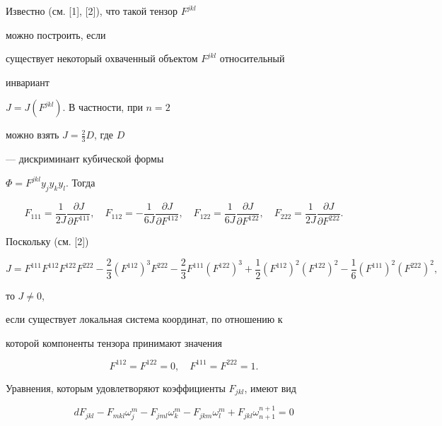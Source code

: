 \begin{notes} 


Известно (см. [1], [2]), что такой тензор $F^{jkl}$ 


можно построить, если 


существует некоторый охваченный объектом $F^{jkl}$ относительный 


инвариант 


$J=J(F^{jkl})$. В частности, при $n=2$ 


можно взять $J=\frac{2}{3}D$, где $D$ 


--- дискриминант кубической формы 


$\Phi=F^{jkl}y_j y_k y_l$. Тогда 


$$ 


F_{111}=\frac{1}{2J}\frac{\partial J}{\partial F^{111}},\quad 


F_{112}=-\frac{1}{6J}\frac{\partial J}{\partial F^{112}},\quad 


F_{122}=\frac{1}{6J}\frac{\partial J}{\partial F^{122}},\quad 


F_{222}=\frac{1}{2J}\frac{\partial J}{\partial F^{222}}. 


$$ 


Поскольку (см. [2]) 


$$ 


J=F^{111}F^{112}F^{122}F^{222}-\frac{2}{3} 


(F^{112})^3F^{222}-\frac{2}{3}F^{111}(F^{122})^3+ 


\frac{1}{2}(F^{112})^2(F^{122})^2- 


\frac{1}{6}(F^{111})^2(F^{222})^2, 


$$ 


то $J\ne 0$, 


если существует локальная система координат, по отношению к 


которой компоненты тензора принимают значения 


$$ 


F^{112}=F^{122}=0,\quad F^{111}=F^{222}=1. 


$$ 


 


Уравнения, которым удовлетворяют коэффициенты $F_{jkl}$, имеют вид 


$$ 


dF_{jkl}-F_{mkl}\omega^m_j-F_{jml}\omega^m_k- 


F_{jkm}\omega^m_l+F_{jkl}\omega^{n+1}_{n+1}=0 


$$ 



\end{notes}
